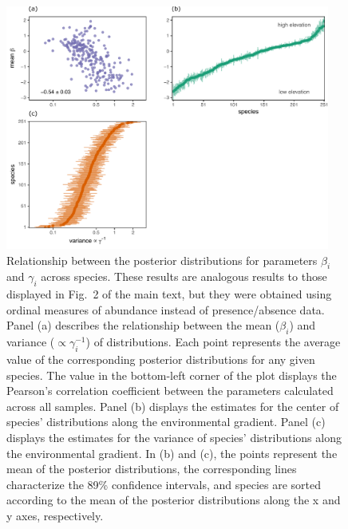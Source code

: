 \documentclass[11pt, a4paper]{article}
\begin{document}
\begin{figure}[ht]
  \centering
    \includegraphics[width=0.95\textwidth]{figures/categorical-figure1}
    	  \vspace{0.1cm}
	   \caption{Relationship between the posterior distributions for parameters $\beta_i$ and $\gamma_i$ across species. These results are analogous results to those displayed in Fig.~2 of the main text, but they were obtained using ordinal measures of abundance instead of presence/absence data. Panel (a) describes the relationship between the mean ($\beta_i$) and variance ($\propto\gamma_i^{-1}$) of distributions. Each point represents the average value of the corresponding posterior distributions for any given species. The value in the bottom-left corner of the plot displays the Pearson's correlation coefficient between the parameters calculated across all samples. Panel (b) displays the estimates for the center of species' distributions along the environmental gradient. Panel (c) displays the estimates for the variance of species' distributions along the environmental gradient. In (b) and (c), the points represent the mean of the posterior distributions, the corresponding lines characterize the 89\% confidence intervals, and species are sorted according to the mean of the posterior distributions along the x and y axes, respectively.}
      \label{sfig:categorical-baseline}
\end{figure}

\clearpage
\end{document}
